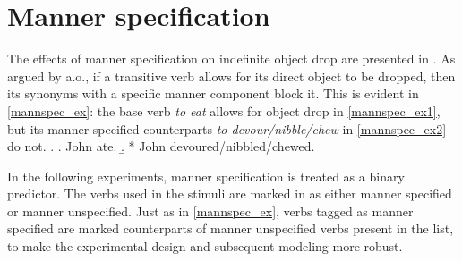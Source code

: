 \section{Manner specification} 

The effects of manner specification on indefinite object drop are presented in . As argued by \textcite{Ruda2017} a.o., if a transitive verb allows for its direct object to be dropped, then its synonyms with a specific manner component block it. This is evident in \ref{mannspec_ex}: the base verb \textit{to eat} allows for object drop in \ref{mannspec_ex1}, but its manner-specified counterparts \textit{to devour/nibble/chew} in \ref{mannspec_ex2} do not.
\ex.\label{mannspec_ex} \a. John ate. \label{mannspec_ex1} 
\b. * John devoured/nibbled/chewed. \label{mannspec_ex2}

In the following experiments, manner specification is treated as a binary predictor. The verbs used in the stimuli are marked in  as either manner specified or manner unspecified. Just as in \ref{mannspec_ex}, verbs tagged as manner specified are marked counterparts of manner unspecified verbs present in the list, to make the experimental design and subsequent modeling more robust.
